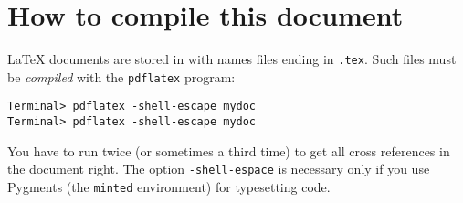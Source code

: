 \documentclass{article}
\begin{document}
\appendix
\section{How to compile this document}

LaTeX{} documents are stored in with names files ending in
\texttt{.tex}.
Such files must be \emph{compiled} with the \texttt{pdflatex} program:

\begin{verbatim}
Terminal> pdflatex -shell-escape mydoc
Terminal> pdflatex -shell-escape mydoc
\end{verbatim}
You have to run twice (or sometimes a third time) to get all cross
references in the document right. The option \verb!-shell-espace!
is necessary only if you use Pygments (the \texttt{minted}
environment) for typesetting code.
\end{document}
